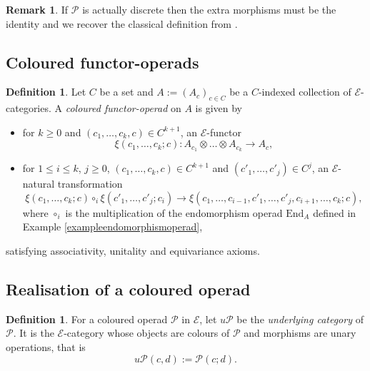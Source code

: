 \documentclass[]{amsart}
\theoremstyle{definition}
\newtheorem{definition}[theorem]{Definition}
\newtheorem{remark}[theorem]{Remark}
\begin{document}
\begin{remark}
	If $\mathcal{P}$ is actually discrete then the extra morphisms must be the identity and we recover the classical definition from \cite{baezdolan}.
\end{remark}


\subsection{Coloured functor-operads}



\begin{definition}\cite[Definition 4.1]{mccluresmith}
	Let $C$ be a set and $A := (A_c)_{c \in C}$ be a $C$-indexed collection of $\mathcal{E}$-categories. A \emph{coloured functor-operad} on $A$ is given by
	\begin{itemize}
		\item for $k \geq 0$ and $(c_1,\ldots,c_k,c) \in C^{k+1}$, an $\mathcal{E}$-functor
		\[
			\xi(c_1,\ldots,c_k;c) : A_{c_1} \otimes \ldots \otimes A_{c_k} \to A_c,
		\]
		\item for $1 \leq i \leq k$, $j \geq 0$, $(c_1,\ldots,c_k,c) \in C^{k+1}$ and $(c'_1,\ldots,c'_j) \in C^j$, an $\mathcal{E}$-natural transformation
		\begin{equation}\label{equationfunctoroperads}
		\xi(c_1,\ldots,c_k;c) \circ_i \xi(c'_1,\ldots,c'_j;c_i) \to \xi(c_1,\ldots,c_{i-1},c'_1,\ldots,c'_j,c_{i+1},\ldots,c_k;c),
		\end{equation}
		where $\circ_i$ is the multiplication of the endomorphism operad $\mathrm{End}_A$ defined in Example \ref{exampleendomorphismoperad},
	\end{itemize}
	satisfying associativity, unitality and equivariance axioms.
\end{definition}



\subsection{Realisation of a coloured operad}

\begin{definition}
	For a coloured operad $\mathcal{P}$ in $\mathcal{E}$, let $u\mathcal{P}$ be the \emph{underlying category} of $\mathcal{P}$. It is the $\mathcal{E}$-category whose objects are colours of $\mathcal{P}$ and morphisms are unary operations, that is
	\[
		u\mathcal{P}(c,d) := \mathcal{P}(c;d).
	\]
\end{definition}
\end{document}
